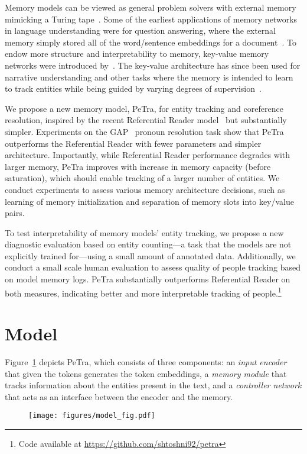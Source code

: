 \documentclass[11pt,a4paper]{article}
\newcommand{\modelname}{PeTra\xspace}
\begin{document}
Memory models
can be viewed as general problem solvers with external memory mimicking a Turing tape~\cite{graves2014neural,graves2016hybrid}.
Some of the earliest applications of memory networks in language understanding were
for question answering, where the external memory simply stored all of the word/sentence embeddings for a document~\cite{sukhbaatar-15, kumar2016ask}.
To endow more structure and interpretability to memory, key-value memory networks were introduced by~\citet{miller-etal-2016-key}.
The key-value architecture has since been used for narrative understanding and other tasks where the memory is intended to learn to track entities while being guided by varying degrees of supervision~\cite{henaff2016tracking, liu-etal-2018-narrative, liu-etal-2018-recurrent, liu2019referential}.



We propose a new memory model, \modelname, for entity tracking and coreference resolution, inspired by the recent Referential Reader model~\cite{liu2019referential} but substantially simpler. Experiments on the GAP~\cite{webster2018gap} pronoun resolution task show that \modelname outperforms the Referential Reader with fewer parameters and simpler architecture.
Importantly, while Referential Reader performance degrades with larger memory, \modelname improves with increase in memory capacity (before saturation), which should enable tracking of a larger number of entities.
We conduct experiments to assess various memory architecture decisions, such as learning of memory initialization and separation of memory slots into key/value pairs.

To test interpretability of
memory models' entity tracking, we propose a new diagnostic evaluation based on entity counting---a task that the models are not explicitly trained for---using a small amount of annotated data.
Additionally, we conduct a small scale human evaluation to assess quality of people tracking based on model memory logs. \modelname substantially outperforms Referential Reader on both measures, indicating better and more interpretable tracking of people.\footnote{Code available at \url{https://github.com/shtoshni92/petra}}
 \section{Model}


Figure~\ref{fig:model_sch} depicts \modelname, which
consists of three components: an {\it input encoder} that given the tokens generates the token embeddings, a {\it memory module} that tracks information about the entities present in the text, and a {\it controller network} that acts as an interface between the encoder and the memory.
\begin{figure}[th]
  \centering
  \texttt{[image: figures/model\_fig.pdf]}
  \label{fig:model_sch}
\end{figure}
\end{document}
